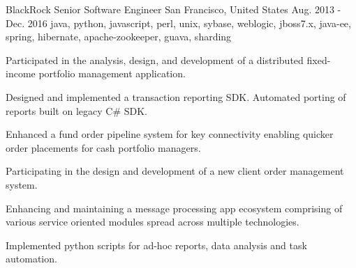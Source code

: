 \cventry
    {BlackRock} %
    {Senior Software Engineer} %
    {San Francisco, United States} %
    {Aug. 2013 - Dec. 2016} %
    {java, python, javascript, perl, unix, sybase, weblogic, jboss7.x, java-ee, spring, hibernate, apache-zookeeper, guava, sharding}%
    {
    \begin{cvitems} %
        \item { Participated in the analysis, design, and development of a distributed fixed-income portfolio management application.}
        \item { Designed and implemented a transaction reporting SDK. Automated porting of reports built on legacy C\# SDK.}
        \item { Enhanced a fund order pipeline system for key connectivity enabling quicker order placements for cash portfolio managers.}
        \item { Participating in the design and development of a new client order management system. }
        \item { Enhancing and maintaining a message processing app ecosystem comprising of various service oriented modules spread across multiple technologies. }
        \item { Implemented python scripts for ad-hoc reports, data analysis and task automation.}
    \end{cvitems}
    }